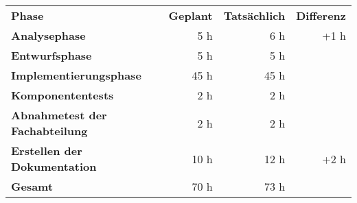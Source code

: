 \begin{tabular}{lrrr}
\rowcolor{heading}\textbf{Phase} & \textbf{Geplant} & \textbf{Tatsächlich} & \textbf{Differenz} \\
\textbf{Analysephase} & 5 h   & 6 h  & +1 h \\
\rowcolor{odd}\textbf{Entwurfsphase} & 5 h  & 5 h  &  \\
\textbf{Implementierungsphase} & 45 h  & 45 h  &  \\
\rowcolor{odd}\textbf{Komponententests} & 2 h   & 2 h   &  \\
\textbf{Abnahmetest der Fachabteilung} & 2 h   & 2 h   &  \\
\rowcolor{odd}\textbf{Erstellen der Dokumentation} & 10 h   & 12 h  & +2 h \\
\hline
\hline
\rowcolor{odd}\textbf{Gesamt} & 70 h  & 73 h  &  \\
\end{tabular}
